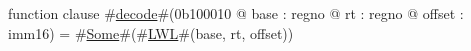 function clause #\hyperref[zdecode]{decode}#(0b100010 @ base : regno @ rt : regno @ offset : imm16) =
      #\hyperref[zSome]{Some}#(#\hyperref[zLWL]{LWL}#(base, rt, offset))
